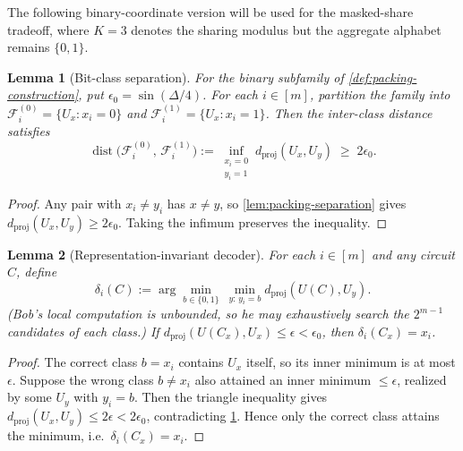 \documentclass[aps,prx,reprint,floatfix,superscriptaddress]{revtex4-2}
\newtheorem{lemma}{Lemma}
\begin{document}
The following binary-coordinate version will be used for the masked-share
tradeoff, where $K=3$ denotes the sharing modulus but the aggregate alphabet
remains $\{0,1\}$.

\begin{lemma}[Bit-class separation]
\label{lem:bit-class-separation}
For the binary subfamily of \cref{def:packing-construction}, put
$\epsilon_0=\sin(\Delta/4)$.  For each $i \in [m]$, partition the family into
$\mathcal{F}_i^{(0)} = \{U_x : x_i = 0\}$ and
$\mathcal{F}_i^{(1)} = \{U_x : x_i = 1\}$. Then the inter-class distance
satisfies
\begin{equation}\label{eq:bit-class-sep}
\operatorname{dist}\!\bigl(\mathcal{F}_i^{(0)},\,\mathcal{F}_i^{(1)}\bigr)
:= \inf_{\substack{x_i=0 \\ y_i=1}} d_{\mathrm{proj}}(U_x, U_y)
\;\geq\; 2\epsilon_0.
\end{equation}
\end{lemma}

\begin{proof}
Any pair with $x_i \neq y_i$ has $x \neq y$, so
\cref{lem:packing-separation} gives $d_{\mathrm{proj}}(U_x, U_y) \geq 2\epsilon_0$.
Taking the infimum preserves the inequality.
\end{proof}

\begin{lemma}[Representation-invariant decoder]
\label{lem:decoder}
For each $i \in [m]$ and any circuit $C$, define
\begin{equation}\label{eq:decoder}
\delta_i(C) :=
\arg\min_{b \in \{0,1\}}\ \min_{y:\, y_i = b} d_{\mathrm{proj}}(U(C), U_y).
\end{equation}
(Bob's local computation is unbounded, so he may exhaustively search the
$2^{m-1}$ candidates of each class.) If
$d_{\mathrm{proj}}(U(C_x), U_x) \leq \epsilon < \epsilon_0$, then
$\delta_i(C_x) = x_i$.
\end{lemma}

\begin{proof}
The correct class $b = x_i$ contains $U_x$ itself, so its inner minimum is
at most $\epsilon$. Suppose the wrong class $b \neq x_i$ also attained an
inner minimum $\leq \epsilon$, realized by some $U_y$ with $y_i = b$. Then
the triangle inequality gives
$d_{\mathrm{proj}}(U_x, U_y) \leq 2\epsilon < 2\epsilon_0$, contradicting
\cref{lem:bit-class-separation}. Hence only the correct class attains the
minimum, i.e.\ $\delta_i(C_x) = x_i$.
\end{proof}
\end{document}
